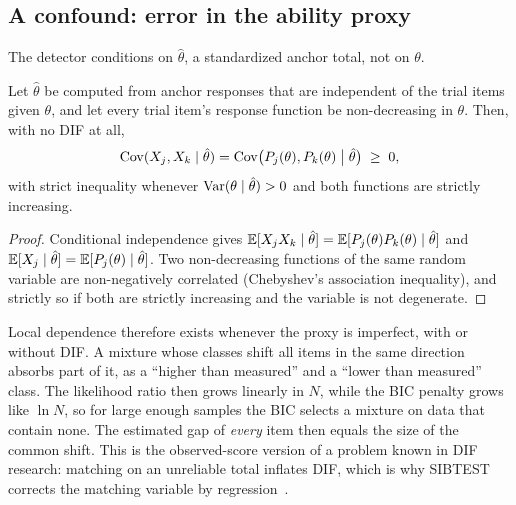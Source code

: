 \subsection{A confound: error in the ability proxy}\label{sec:proxy}

The detector conditions on $\hat\theta$, a standardized anchor total, not on $\theta$.

\begin{proposition}\label{prop:proxy}\proved{}
Let $\hat\theta$ be computed from anchor responses that are independent of the trial items
given $\theta$, and let every trial item's response function be non-decreasing in $\theta$.
Then, with no DIF at all,
\begin{equation}
  \operatorname{Cov}(X_j,X_k\mid\hat\theta)=\operatorname{Cov}\bigl(P_j(\theta),P_k(\theta)\bigm|\hat\theta\bigr)\;\ge\;0,
\end{equation}
with strict inequality whenever $\operatorname{Var}(\theta\mid\hat\theta)>0$ and both functions are strictly
increasing.
\end{proposition}
\begin{proof}
Conditional independence gives $\mathbb{E}[X_jX_k\mid\hat\theta]=\mathbb{E}[P_j(\theta)P_k(\theta)\mid\hat\theta]$
and $\mathbb{E}[X_j\mid\hat\theta]=\mathbb{E}[P_j(\theta)\mid\hat\theta]$. Two non-decreasing functions of the
same random variable are non-negatively correlated (Chebyshev's association inequality), and
strictly so if both are strictly increasing and the variable is not degenerate.
\end{proof}

Local dependence therefore exists whenever the proxy is imperfect, with or without DIF. A
mixture whose classes shift all items in the same direction absorbs part of it, as a ``higher
than measured'' and a ``lower than measured'' class. The likelihood ratio then grows linearly
in $N$, while the BIC penalty grows like $\ln N$, so for large enough samples the BIC selects a
mixture on data that contain none. The estimated gap of \emph{every} item then equals the size of
the common shift. This is the observed-score version of a problem known in DIF research:
matching on an unreliable total inflates DIF, which is why SIBTEST corrects the matching
variable by regression~\cite{shealy1993sibtest}.

